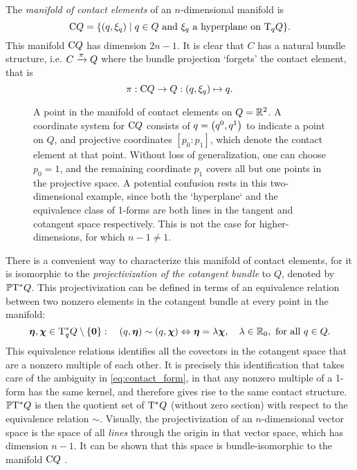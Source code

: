 The \emph{manifold of contact elements} of an \(n\)-dimensional manifold is \cite{Cannas2001}
\begin{equation}
     \mathrm{C}Q = \qty{(q, \xi_q) \mid q \in Q \text{ and } \xi_q \text{ a hyperplane on } \ensuremath{\mathrm{T}_{q} Q}}.
\end{equation}
This manifold \(\mathrm{C}Q\) has dimension \(2n - 1\). It is clear that \(C\) has a natural bundle structure, i.e. \(C\xrightarrow[]{\pi}Q\) where the bundle projection `forgets' the contact element, that is
\begin{equation}
     \pi: \mathrm{C}Q \to {Q}: (q, \xi_q) \mapsto q.
\end{equation}
\begin{figure}[ht!]
    \centering
    
    \caption{A point in the manifold of contact elements on \(Q = \mathbb{R}^2\). A coordinate system for \(\mathrm{C}Q\) consists of \(q = \qty(q^0, q^1)\) to indicate a point on \(Q\), and projective coordinates \([p_0:p_1]\), which denote the contact element at that point. Without loss of generalization, one can choose \(p_0 = 1\), and the remaining coordinate \(p_1\) covers all but one points in the projective space. A potential confusion rests in this two-dimensional example, since both the `hyperplane` and the equivalence class of 1-forms are both lines in the tangent and cotangent space respectively. This is not the case for higher-dimensions, for which \(n - 1 \neq 1\).}
    \label{fig:contact_element}
\end{figure}

There is a convenient way to characterize this manifold of contact elements, for it is isomorphic to the \emph{projectivization of the cotangent bundle} to \(Q\), denoted by \(\mathbb{P}\mathrm{T}^* Q\). This projectivization can be defined in terms of an equivalence relation between two nonzero elements in the cotangent bundle at every point in the manifold:
\begin{equation}
     \vec{\eta},\vec{\chi}\in \ctspace{q}{Q} \setminus \{\mathbf{0}\}:\quad (q, \vec{\eta}) \sim (q, \vec{\chi}) \Leftrightarrow \vec{\eta} = \lambda \vec{\chi},\quad \lambda \in \real_0, \text{ for all } q \in Q.
\end{equation}
This equivalence relations identifies all the covectors in the cotangent space that are a nonzero multiple of each other. It is precisely this identification that takes care of the ambiguity in \cref{eq:contact_form}, in that any nonzero multiple of a 1-form has the same kernel, and therefore gives rise to the same contact structure. \(\mathbb{P}\mathrm{T}^* Q\) is then the quotient set of \(\mathrm{T}^*Q\) (without zero section) with respect to the equivalence relation \(\sim\). Visually, the projectivization of an \(n\)-dimensional vector space is the space of all \emph{lines} through the origin in that vector space, which has dimension \(n - 1\). It can be shown that this space is bundle-isomorphic to the manifold \(\mathrm{C}Q\) \cite{Cannas2001}.

